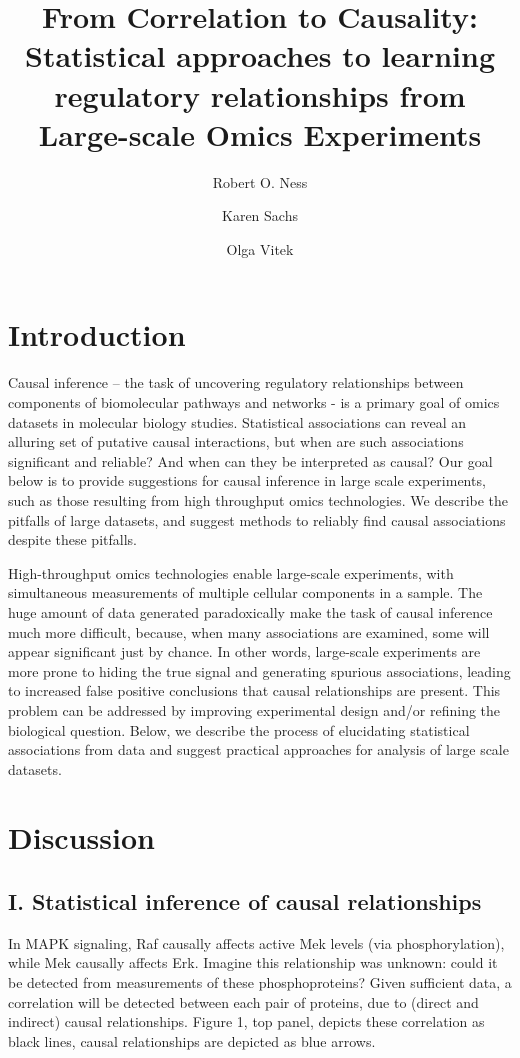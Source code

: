 \documentclass[journal=jacsat,manuscript=article]{achemso}
\author{Robert O. Ness}
\affiliation[Purdue University]{Department of Statistics, Purdue University, West Lafayette}
\author{Karen Sachs}
\affiliation[Stanford University]{School of Medicine, Stanford University, Palo Alto}
\author{Olga Vitek}
\affiliation[Northeastern University]{College of Science, College of Computer and Information Science, Northeastern University, Palo Alto}
\title[]
  {From Correlation to Causality: Statistical approaches to learning regulatory relationships from Large-scale Omics Experiments}
\begin{document}
\section{Introduction}
Causal inference -- the task of uncovering regulatory relationships
between components of biomolecular pathways and networks - is a primary
goal of omics datasets in molecular biology studies. Statistical
associations can reveal an alluring set of putative causal interactions,
but when are such associations significant and reliable? And when can
they be interpreted as causal? Our goal below is to provide suggestions
for causal inference in large scale experiments, such as those resulting
from high throughput omics technologies. We describe the pitfalls of
large datasets, and suggest methods to reliably find causal associations
despite these pitfalls.

High-throughput omics technologies enable large-scale experiments, with
simultaneous measurements of multiple cellular components in a sample.
The huge amount of data generated paradoxically make the task of causal
inference much more difficult, because, when many associations are
examined, some will appear significant just by chance. In other words,
large-scale experiments are more prone to hiding the true signal and
generating spurious associations, leading to increased false positive
conclusions that causal relationships are present. This problem can be
addressed by improving experimental design and/or refining the
biological question. Below, we describe the process of elucidating
statistical associations from data and suggest practical approaches for
analysis of large scale datasets.
\section{Discussion}
\subsection{I. Statistical inference of causal relationships}

In MAPK signaling, Raf causally affects active Mek levels (via
phosphorylation), while Mek causally affects Erk. Imagine this
relationship was unknown: could it be detected from measurements of
these phosphoproteins? Given sufficient data, a correlation will be
detected between each pair of proteins, due to (direct and indirect)
causal relationships. Figure 1, top panel, depicts these correlation as
black lines, causal relationships are depicted as blue arrows.
\end{document}
